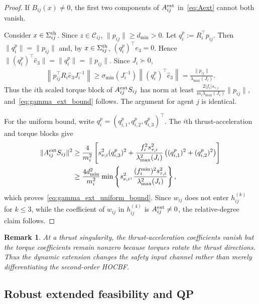 \documentclass[journal,twoside,web]{ieeecolor}
\newtheorem{remark}[theorem]{Remark}
\begin{document}
\begin{proof}
If $B_{ij}(x)\neq0$, the first two components of
$A_{ij}^{\rm ext}$ in~\eqref{eq:Aext} cannot both vanish.

Consider $x\in\Sigma_{ij}^{\rm th}$. Since $z\in\mathcal C_{ij}$,
$\|p_{ij}\|\ge d_{\min}>0$.
Let $q_i^p:=R_i^\top p_{ij}$. Then
$\|q_i^p\|=\|p_{ij}\|$ and, by
$x\in\Sigma_{ij}^{\rm th}$,
$(q_i^p)^\top e_3=0$. Hence
$\|(q_i^p)^\top\widehat e_3\|
    =
    \|q_i^p\|
    =
    \|p_{ij}\|$. Since $J_i\succ0$,
\[
\begin{aligned}
\left\|
p_{ij}^\top R_i\widehat e_3J_i^{-1}
\right\|
\ge
\sigma_{\min}(J_i^{-1})
\left\|
(q_i^p)^\top\widehat e_3
\right\| =
\frac{\|p_{ij}\|}{\lambda_{\max}(J_i)}.
\end{aligned}
\]
Thus the $i$th scaled torque block of
$A_{ij}^{\rm ext}S_{ij}$ has norm at least
$\frac{2|f_i|s_{\tau,i}}{m_i\lambda_{\max}(J_i)}
\|p_{ij}\|$, and~\eqref{eq:gamma_ext_bound} follows.
The argument for agent $j$ is identical. 

For the uniform bound, write
$q_i^p=(q_{i,1}^p,q_{i,2}^p,q_{i,3}^p)^\top$.
The $i$th thrust-acceleration and torque blocks give
\[
\begin{aligned}
\|A_{ij}^{\rm ext}S_{ij}\|^2
&\ge
\frac{4}{m_i^2}
\left[
s_{\nu,i}^2(q_{i,3}^p)^2
+
\frac{f_i^2s_{\tau,i}^2}
{\lambda_{\max}^2(J_i)}
\left((q_{i,1}^p)^2+(q_{i,2}^p)^2\right)
\right] \\
&\ge
\frac{4d_{\min}^2}{m_i^2}
\min\left\{
s_{\nu,i}^2,
\frac{(f_i^{\min})^2s_{\tau,i}^2}
{\lambda_{\max}^2(J_i)}
\right\},
\end{aligned}
\]
which proves~\eqref{eq:gamma_ext_uniform_bound}. Since $w_{ij}$
does not enter $h_{ij}^{(k)}$
for $k\le 3$, while the coefficient of $w_{ij}$
in $h_{ij}^{(4)}$
is $A_{ij}^{\rm ext}\neq 0$, the relative-degree claim follows.
\end{proof}

\begin{remark}
At a thrust singularity, the thrust-acceleration coefficients
vanish but the torque coefficients remain nonzero because
torques rotate the thrust directions. Thus the dynamic
extension changes the safety input channel rather than merely
differentiating the second-order HOCBF.
\end{remark}

\subsection{Robust extended feasibility and QP}
\end{document}
